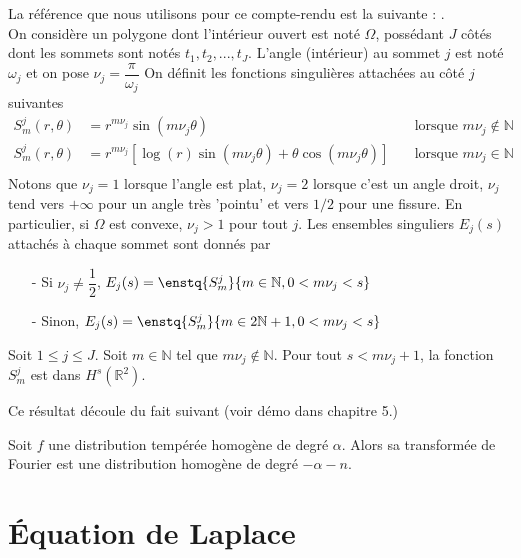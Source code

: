 \documentclass[11pt,a4paper]{article}
\begin{document}
La référence que nous utilisons pour ce compte-rendu est la suivante : \cite{petersdorff1990decompositions}. \\
On considère un polygone dont l'intérieur ouvert est noté $\Omega$, possédant $J$ côtés dont les sommets sont notés $t_1, t_2,..., t_J$. L'angle (intérieur) au sommet $j$ est noté $\omega_j$ et on pose $\nu_j = \dfrac{\pi}{\omega_j}$
On définit les fonctions singulières attachées au côté $j$ suivantes
\begin{align*}
S_m^j(r,\theta) &= r^{m \nu_j} \sin\left(m \nu_j \theta\right) \quad & \text{lorsque } m\nu_j \notin \mathbb{N} \\
 S_m^j(r,\theta) &= r^{m \nu_j} \left[\log(r)\sin\left(m\nu_j \theta\right) + \theta\cos\left(m\nu_j \theta\right)\right] \quad & \text{lorsque } m\nu_j \in \mathbb{N} \\
\end{align*}
Notons que $\nu_j = 1$ lorsque l'angle est plat, $\nu_j=2$ lorsque c'est un angle droit, $\nu_j$ tend vers $+\infty$ pour un angle très 'pointu' et vers $1/2$ pour une fissure. En particulier, si $\Omega$ est convexe, $\nu_j > 1$ pour tout $j$. 
Les ensembles singuliers $E_j(s)$ attachés à chaque sommet sont donnés par
\begin{itemize}
\item[-] Si $\nu_j \neq \dfrac{1}{2}$, $E_j(s) = \enstq{S_m^j}{m \in \mathbb{N}, 0 < m\nu_j < s}$
\item[-] Sinon, $E_j(s) = \enstq{S_m^j}{m \in 2\mathbb{N}+1, 0 < m\nu_j < s}$
\end{itemize}
\begin{Prop} Soit $1 \leq j \leq J$. Soit $m \in \mathbb{N}$ tel que $m\nu_j \notin \mathbb{N}$. Pour tout $s <  m\nu_j + 1$, la fonction $S_m^j$ est dans $H^s(\mathbb{R}^2)$. 
\end{Prop}
Ce résultat découle du fait suivant (voir démo dans \cite{mclean2000strongly} chapitre 5.) 
\begin{Prop} Soit $f$ une distribution tempérée homogène de degré $\alpha$. Alors sa transformée de Fourier est une distribution homogène de degré $-\alpha-n$. 
\end{Prop}

\section{Équation de Laplace}
\end{document}
